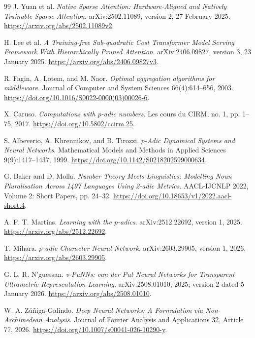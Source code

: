 \documentclass[11pt]{article}
\begin{document}
\begin{thebibliography}{99}
J. Yuan et al. \emph{Native Sparse Attention: Hardware-Aligned and Natively
Trainable Sparse Attention}. arXiv:2502.11089, version 2, 27 February 2025.
\url{https://arxiv.org/abs/2502.11089v2}.

H. Lee et al. \emph{A Training-free Sub-quadratic Cost Transformer Model
Serving Framework With Hierarchically Pruned Attention}.
arXiv:2406.09827, version 3, 23 January 2025.
\url{https://arxiv.org/abs/2406.09827v3}.

R. Fagin, A. Lotem, and M. Naor.
\emph{Optimal aggregation algorithms for middleware}.
Journal of Computer and System Sciences 66(4):614--656, 2003.
\url{https://doi.org/10.1016/S0022-0000(03)00026-6}.

X. Caruso. \emph{Computations with \(p\)-adic numbers}. Les cours du CIRM,
no. 1, pp. 1--75, 2017. \url{https://doi.org/10.5802/ccirm.25}.

S. Albeverio, A. Khrennikov, and B. Tirozzi.
\emph{\(p\)-Adic Dynamical Systems and Neural Networks}.
Mathematical Models and Methods in Applied Sciences 9(9):1417--1437, 1999.
\url{https://doi.org/10.1142/S0218202599000634}.

G. Baker and D. Molla.
\emph{Number Theory Meets Linguistics: Modelling Noun Pluralisation Across
1497 Languages Using 2-adic Metrics}.
AACL-IJCNLP 2022, Volume 2: Short Papers, pp. 24--32.
\url{https://doi.org/10.18653/v1/2022.aacl-short.4}.

A. F. T. Martins. \emph{Learning with the \(p\)-adics}.
arXiv:2512.22692, version 1, 2025.
\url{https://arxiv.org/abs/2512.22692}.

T. Mihara. \emph{\(p\)-adic Character Neural Network}.
arXiv:2603.29905, version 1, 2026.
\url{https://arxiv.org/abs/2603.29905}.

G. L. R. N'guessan. \emph{v-PuNNs: van der Put Neural Networks for Transparent
Ultrametric Representation Learning}. arXiv:2508.01010, 2025;
version 2 dated 5 January 2026. \url{https://arxiv.org/abs/2508.01010}.

W. A. Z\'u\~niga-Galindo.
\emph{Deep Neural Networks: A Formulation via Non-Archimedean Analysis}.
Journal of Fourier Analysis and Applications 32, Article 77, 2026.
\url{https://doi.org/10.1007/s00041-026-10290-y}.


\end{thebibliography}
\end{document}
